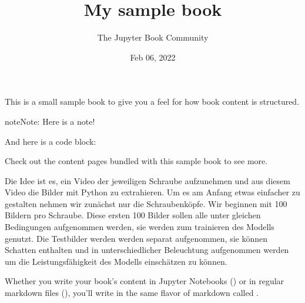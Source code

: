 \documentclass[letterpaper,10pt,english]{jupyterBook}
\title{My sample book}
\date{Feb 06, 2022}
\author{The Jupyter Book Community}
\begin{document}
\pagestyle{empty}
\sphinxmaketitle
\pagestyle{plain}
\sphinxtableofcontents
\pagestyle{normal}
\label{\detokenize{00_Intro/intro::doc}}


\sphinxAtStartPar
This is a small sample book to give you a feel for how book content is
structured.

\begin{sphinxadmonition}{note}{Note:}
\sphinxAtStartPar
Here is a note!
\end{sphinxadmonition}

\sphinxAtStartPar
And here is a code block:

\begin{sphinxVerbatim}[commandchars=\\\{\}]
  
\end{sphinxVerbatim}

\sphinxAtStartPar
Check out the content pages bundled with this sample book to see more.

\sphinxAtStartPar
{}

\sphinxAtStartPar
Die Idee ist es, ein Video der jeweiligen Schraube aufzunehmen und aus diesem Video die Bilder mit Python zu extrahieren. Um es am Anfang etwas einfacher zu gestalten nehmen wir zunächst nur die Schraubenköpfe. Wir beginnen mit 100 Bildern pro Schraube. Diese ersten 100 Bilder sollen alle unter gleichen Bedingungen aufgenommen werden, sie werden zum trainieren des Modells genutzt. Die Testbilder werden werden separat aufgenommen, sie können Schatten enthalten und in unterschiedlicher Beleuchtung aufgenommen werden um die Leistungsfähigkeit des Modells einschätzen zu können.

\begin{DUlineblock}{0em}
\item[] 
\end{DUlineblock}

\sphinxAtStartPar
Whether you write your book’s content in Jupyter Notebooks () or
in regular markdown files (), you’ll write in the same flavor of markdown
called .

\begin{DUlineblock}{0em}
\item[] 
\end{DUlineblock}
\end{document}
